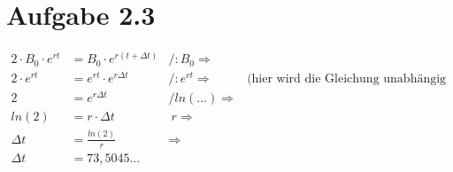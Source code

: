 \section*{Aufgabe 2.3}

\begin{align*}
2 \cdot B_0 \cdot e^{r t} &= B_0 \cdot e^{r(t+\Delta t)}&/ :B_0 \Rightarrow&\\
2 \cdot e^{r t} &= e^{r t} \cdot e^{r \Delta t} & / :e^{r t} \Rightarrow  & \text{(hier wird die Gleichung unabhängig gemacht)}\\
2 &= e^{r \Delta t}&/ ln(...)  \Rightarrow  &\\
ln(2) &= r \cdot \Delta t&\:r  \Rightarrow  &\\
\Delta t &= \frac{ln(2)}{r}& \Rightarrow  &\\
\Delta t &= 73,5045...&&
\end{align*}

\newpage
